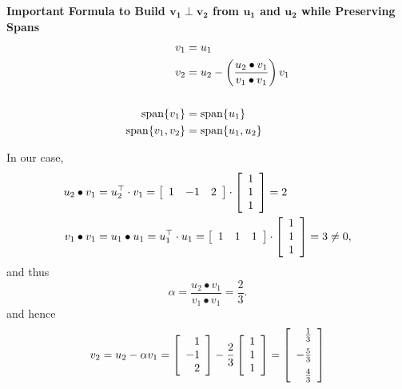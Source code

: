 \begin{tcolorbox}
\textbf{Important Formula to Build $\boldsymbol{v_1 \perp v_2}$ from $\boldsymbol{u_1}$ and $\boldsymbol{u_2}$ while Preserving Spans}
\begin{equation}
    \label{eq:OrthognalProjection01}
    \begin{aligned}
    v_1 &= u_1\\
    v_2 &= u_2 -  \left(\frac{u_2 \bullet v_1}{v_1 \bullet v_1}\right) v_1\\
    \\ 
    \mathrm{span} \{ v_1 \}&=\mathrm{span} \{ u_1 \}\\
    \mathrm{span} \{ v_1, v_2 \}&= \mathrm{span} \{ u_1, u_2 \}
     \end{aligned}
\end{equation}
\end{tcolorbox}

In our case, 
\begin{align*}
  u_2 \bullet v_1&= u_2^\top \cdot v_1 = \left[\begin{array}{ccc}  1 & -1 & 2 \end{array} \right] \cdot \left[\begin{array}{c}  1 \\ 1 \\1\end{array} \right] =  2 \bigskip \\
    v_1 \bullet v_1 &= u_1 \bullet u_1 = u_1^\top \cdot  u_1 = \left[\begin{array}{ccc}  1 & 1 & 1 \end{array} \right] \cdot \left[\begin{array}{c}  1 \\ 1 \\1\end{array} \right] = 3 \neq 0,
\end{align*}
and thus
$$\alpha = \frac{u_2 \bullet v_1}{v_1 \bullet v_1} = \frac{2}{3}. $$
and hence
$$v_2 = u_2  - \alpha v_1 = \left[\begin{array}{r}  1 \\ -1 \\2\end{array} \right] - \frac{2}{3} \left[\begin{array}{c}  1 \\ 1 \\1\end{array} \right] = \left[\begin{array}{r}  \frac{1}{3} \medskip \\ -\frac{5}{3} \medskip \\\frac{4}{3} \end{array} \right] $$

